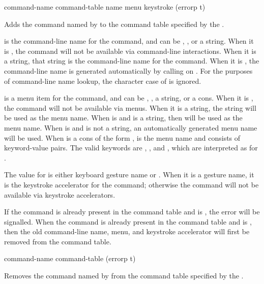  {command-name command-table
                                       \key name menu keystroke (errorp t)}

Adds the command named by  to the command table specified by
the  .

 is the command-line name for the command, and can be ,
, or a string.  When it is , the command will not be available via
command-line interactions.  When it is a string, that string is the command-line
name for the command.  When it is , the command-line name is generated
automatically by calling  on .
For the purposes of command-line name lookup, the character case of 
is ignored.

 is a menu item for the command, and can be , , a
string, or a cons.  When it is , the command will not be available via
menus.  When it is a string, the string will be used as the menu name.  When
 is  and  is a string, then  will be used
as the menu name.  When  is  and  is not a string,
an automatically generated menu name will be used.  When  is a cons
of the form ,  is the menu
name and  consists of keyword-value pairs.  The valid
keywords are , , and , which are
interpreted as for .

The value for  is either keyboard gesture name or .  When
it is a gesture name, it is the keystroke accelerator for the command; otherwise
the command will not be available via keystroke accelerators.

If the command is already present in the command table and  is
, the  error will be signalled.  When the
command is already present in the command table and  is
, then the old command-line name, menu, and keystroke accelerator
will first be removed from the command table.


 {command-name command-table \key (errorp t)}

Removes the command named by  from the command table specified
by the  .

